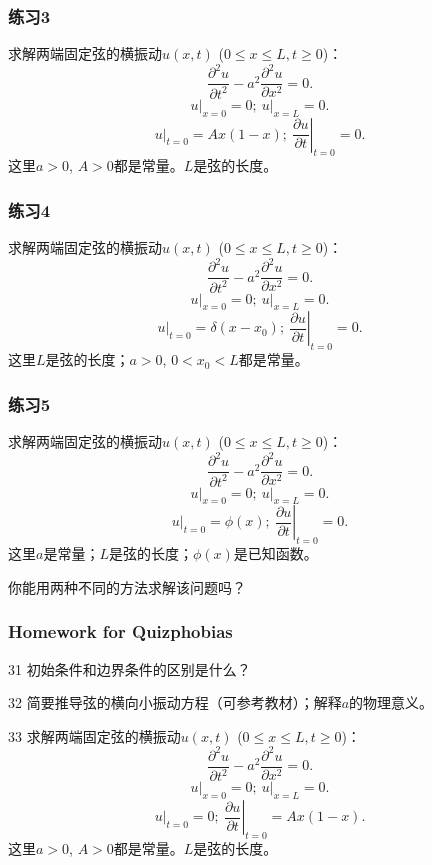 \documentclass[CJK]{beamer}
\begin{document}
\begin{frame}
  \frametitle{练习3}
  求解两端固定弦的横振动$u(x, t)$ ($0\le x\le L, t\ge 0$)：
  $$\frac{\partial^2u}{\partial t^2} - a^2\frac{\partial^2u}{\partial x^2} = 0 .$$
  $$ \left.u\right\vert_{x=0} = 0;\ \left.u\right\vert_{x=L} = 0.$$
  $$ \left.u\right\vert_{t=0} = Ax(1-x);\ \left.\frac{\partial u}{\partial t}\right\vert_{t=0} = 0.$$
  这里$a>0$, $A>0$都是常量。$L$是弦的长度。
\end{frame}

\begin{frame}
  \frametitle{练习4}
  求解两端固定弦的横振动$u(x, t)$ ($0\le x\le L, t\ge 0$)：
  $$\frac{\partial^2u}{\partial t^2} - a^2\frac{\partial^2u}{\partial x^2} = 0 .$$
  $$ \left.u\right\vert_{x=0} = 0;\ \left.u\right\vert_{x=L} = 0.$$
  $$ \left.u\right\vert_{t=0} = \delta(x-x_0);\ \left.\frac{\partial u}{\partial t}\right\vert_{t=0} = 0.$$
  这里$L$是弦的长度；$a>0$, $0<x_0<L$都是常量。
\end{frame}


\begin{frame}
  \frametitle{练习5}
  求解两端固定弦的横振动$u(x, t)$ ($0\le x\le L, t\ge 0$)：
  $$\frac{\partial^2u}{\partial t^2} - a^2\frac{\partial^2u}{\partial x^2} = 0 .$$
  $$ \left.u\right\vert_{x=0} = 0;\ \left.u\right\vert_{x=L} = 0.$$
  $$ \left.u\right\vert_{t=0} = \phi(x);\ \left.\frac{\partial u}{\partial t}\right\vert_{t=0} = 0.$$
  这里$a$是常量；$L$是弦的长度；$\phi(x)$是已知函数。

  \skipline
  你能用两种不同的方法求解该问题吗？
\end{frame}


\begin{frame}
  \frametitle{Homework for Quizphobias}
  {\small
    \bitem
  \item[31]{初始条件和边界条件的区别是什么？}
  \item[32]{简要推导弦的横向小振动方程（可参考教材）；解释$a$的物理意义。}
  \item[33]{求解两端固定弦的横振动$u(x, t)$ ($0\le x\le L, t\ge 0$)：
  $$\frac{\partial^2u}{\partial t^2} - a^2\frac{\partial^2u}{\partial x^2} = 0 .$$
  $$ \left.u\right\vert_{x=0} = 0;\ \left.u\right\vert_{x=L} = 0.$$
  $$ \left.u\right\vert_{t=0} = 0;\ \left.\frac{\partial u}{\partial t}\right\vert_{t=0} = Ax(1-x).$$
    这里$a>0$, $A>0$都是常量。$L$是弦的长度。}
    \eitem}
\end{frame}

\ech
\end{document}

